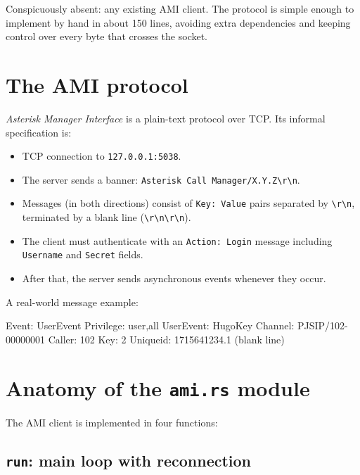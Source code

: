Conspicuously absent: any existing AMI client. The protocol is simple enough to implement by hand in about 150 lines, avoiding extra dependencies and keeping control over every byte that crosses the socket.

\section{The AMI protocol}

\emph{Asterisk Manager Interface} is a plain-text protocol over TCP. Its informal specification is:

\begin{itemize}
  \item TCP connection to \texttt{127.0.0.1:5038}.
  \item The server sends a banner: \texttt{Asterisk Call Manager/X.Y.Z\textbackslash r\textbackslash n}.
  \item Messages (in both directions) consist of \texttt{Key: Value} pairs separated by \texttt{\textbackslash r\textbackslash n}, terminated by a blank line (\texttt{\textbackslash r\textbackslash n\textbackslash r\textbackslash n}).
  \item The client must authenticate with an \texttt{Action: Login} message including \texttt{Username} and \texttt{Secret} fields.
  \item After that, the server sends asynchronous events whenever they occur.
\end{itemize}

A real-world message example:

\begin{plaincode}
Event: UserEvent
Privilege: user,all
UserEvent: HugoKey
Channel: PJSIP/102-00000001
Caller: 102
Key: 2
Uniqueid: 1715641234.1
(blank line)
\end{plaincode}

\section{Anatomy of the \texttt{ami.rs} module}

The AMI client is implemented in four functions:

\subsection{\texttt{run}: main loop with reconnection}

